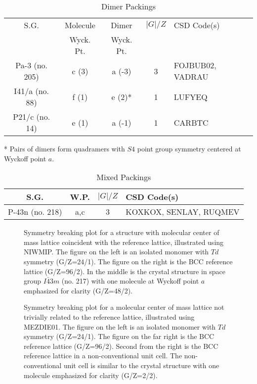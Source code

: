 \documentclass{iucr}              %
\begin{document}
\begin{table}
\caption{Dimer Packings}
\label{tab_dimers}
\begin{tabular}{ccccl}      %
S.G. & Molecule & Dimer & $|G|/Z$& CSD Code(s) \\
& Wyck. Pt. & Wyck. Pt. \\
\hline
Pa-3 (no. 205) & c (3) & a (-3)	& 3	& FOJBUB02, VADRAU \\
I41/a (no. 88) & f (1) & e (2)*	& 1	& LUFYEQ \\
P21/c (no. 14) & e (1) & a (-1)	& 1	& CARBTC \\
\hline
\end{tabular}
* Pairs of dimers form quadramers with $S4$ point group symmetry centered at Wyckoff point $a$.
\end{table}

\begin{table}
\caption{Mixed Packings}
\label{tab_mixed}
\begin{tabular}{cccl}      %
S.G. & W.P. & $|G|/Z$& CSD Code(s) \\
\hline
P-43n (no. 218) & a,c & 3	& KOXKOX, SENLAY, RUQMEV \\
\hline
\end{tabular}
\end{table}



\begin{figure}
\caption{Symmetry breaking plot for a structure with molecular center of mass lattice coincident with the reference lattice, illustrated using NIWMIP.  The figure on the left is an isolated monomer with $Td$ symmetry (G/Z=24/1).  The figure on the right is the BCC reference lattice (G/Z=96/2).  In the middle is the crystal structure in space group $I\bar{4}3m$ (no. 217) with one molecule at Wyckoff point $a$ emphasized for clarity (G/Z=48/2).}
\label{fig_NIWMIP}
\end{figure}

\begin{figure}
\caption{Symmetry breaking plot for a molecular center of mass lattice not trivially related to the reference lattice, illustrated using MEZDIE01.  The figure on the left is an isolated monomer with $Td$ symmetry (G/Z=24/1).  The figure on the far right is the BCC reference lattice (G/Z=96/2).  Second from the right is the BCC reference lattice in a non-conventional unit cell.  The non-conventional unit cell is similar to the crystal structure with one molecule emphasized for clarity (G/Z=2/2).}
\label{fig_MEZDIE01}
\end{figure}
\end{document}
